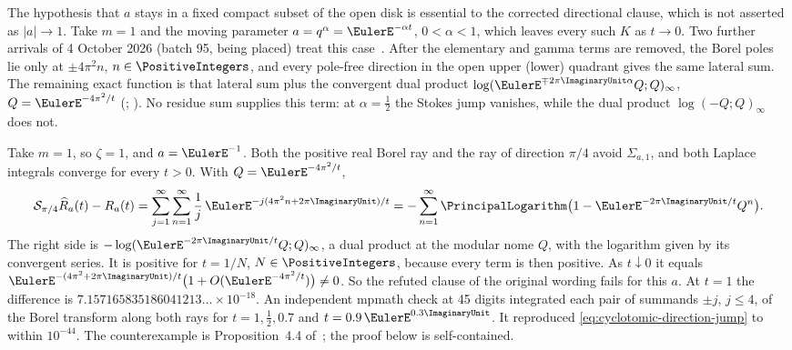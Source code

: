 The hypothesis that \(a\) stays in a fixed compact subset of the open disk is
essential to the corrected directional clause, which is not asserted as
\(\lvert a\rvert\to1\).  Take \(m=1\) and the moving parameter
\(a=q^\alpha=\EulerE^{-\alpha t}\), \(0<\alpha<1\), which leaves every such \(K\) as
\(t\to0\).  Two further arrivals of 4 October 2026 (batch 95, being placed)
treat this case~\cite{CriticalStokesQGamma2026,ExactQProductCompletion2026}.
After the elementary and gamma terms are removed, the Borel poles lie only at
\(\pm4\pi^2n\), \(n\in\PositiveIntegers\), and every pole-free direction in the
open upper (lower) quadrant gives the same lateral sum.  The remaining exact
function is that lateral sum plus the convergent dual product
\(\log(\EulerE^{\mp2\pi\ImaginaryUnit\alpha}Q;Q)_\infty\),
\(Q=\EulerE^{-4\pi^2/t}\) (\cite[Theorem~6.1]{CriticalStokesQGamma2026};
\cite[Theorem~4.1]{ExactQProductCompletion2026}).  No residue sum supplies
this term: at \(\alpha=\tfrac12\) the Stokes jump vanishes, while the dual
product \(\log(-Q;Q)_\infty\) does not.

\begin{remark}
\label{rem:cyclotomic-direction-counterexample}
Take \(m=1\), so \(\zeta=1\), and \(a=\EulerE^{-1}\).  Both the positive real Borel ray
and the ray of direction \(\pi/4\) avoid \(\Sigma_{a,1}\), and both Laplace
integrals converge for every \(t>0\).  With \(Q=\EulerE^{-4\pi^2/t}\),
\begin{equation}
 \mathcal S_{\pi/4}\FormalGevreySeriesSymbol{R}_a(t)-R_a(t)
  =\sum_{j=1}^{\infty}\sum_{n=1}^{\infty}
     \frac1j\,\EulerE^{-j(4\pi^2n+2\pi\ImaginaryUnit)/t}
  =-\sum_{n=1}^{\infty}
     \PrincipalLogarithm\bigl(1-\EulerE^{-2\pi\ImaginaryUnit/t}Q^n\bigr).
 \label{eq:cyclotomic-direction-jump}
\end{equation}
The right side is \(-\log(\EulerE^{-2\pi\ImaginaryUnit/t}Q;Q)_\infty\), a
dual product at the modular nome \(Q\), with the logarithm given by its
convergent series.  It is positive for
\(t=1/N\), \(N\in\PositiveIntegers\), because every term is then positive.  As
\(t\downarrow0\) it equals
\(\EulerE^{-(4\pi^2+2\pi\ImaginaryUnit)/t}\bigl(1+O(\EulerE^{-4\pi^2/t})\bigr)\ne0\).
So the refuted clause of the original wording fails for this \(a\).  At
\(t=1\) the difference is
\(7.157165835186041213\ldots\times10^{-18}\).  An independent mpmath check at
45 digits integrated each pair of summands \(\pm j\), \(j\le4\), of the Borel
transform along both rays for \(t=1,\tfrac12,0.7\) and
\(t=0.9\,\EulerE^{0.3\ImaginaryUnit}\).  It reproduced
\eqref{eq:cyclotomic-direction-jump} to within \(10^{-44}\).  The counterexample
is Proposition~4.4 of~\cite{ModularCuspReversion2026}; the proof below is
self-contained.
\end{remark}

